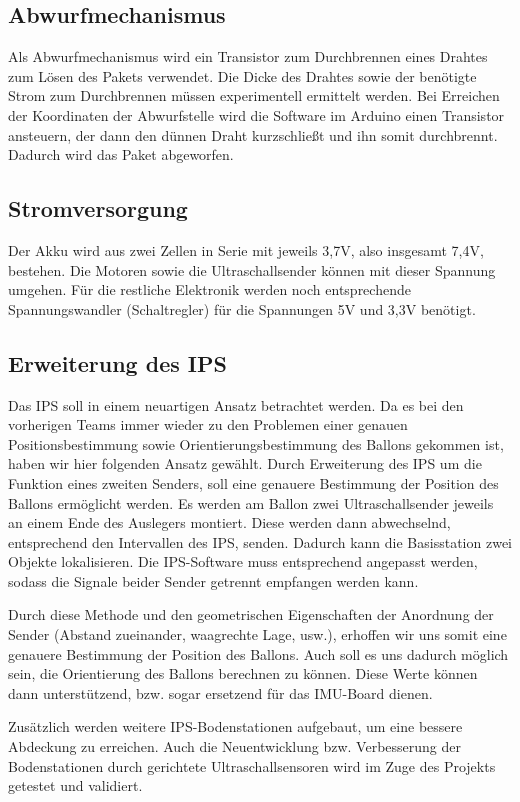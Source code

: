 \documentclass[lang=ngerman,inputenc=utf8,fontsize=10pt]{ldvarticle}
\begin{document}
\subsection*{Abwurfmechanismus}
Als Abwurfmechanismus wird ein Transistor zum Durchbrennen eines Drahtes zum Lösen des Pakets verwendet. Die Dicke des Drahtes sowie der benötigte Strom zum Durchbrennen müssen experimentell ermittelt werden. Bei Erreichen der Koordinaten der Abwurfstelle wird die Software im Arduino einen Transistor ansteuern, der dann den dünnen Draht kurzschließt und ihn somit durchbrennt. Dadurch wird das Paket abgeworfen.
\subsection*{Stromversorgung}
Der Akku wird aus zwei Zellen in Serie mit jeweils 3,7V, also insgesamt 7,4V, bestehen. Die Motoren sowie die Ultraschallsender können mit dieser Spannung umgehen. Für die restliche Elektronik werden noch entsprechende Spannungswandler (Schaltregler) für die Spannungen 5V und 3,3V benötigt.
\subsection*{Erweiterung des IPS}
Das IPS soll in einem neuartigen Ansatz betrachtet werden. Da es bei den vorherigen Teams immer wieder zu den Problemen einer genauen Positionsbestimmung sowie Orientierungsbestimmung des Ballons gekommen ist, haben wir hier folgenden Ansatz gewählt.
Durch Erweiterung des IPS um die Funktion eines zweiten Senders, soll eine genauere Bestimmung der Position des Ballons ermöglicht werden. Es werden am Ballon zwei Ultraschallsender jeweils an einem Ende des Auslegers montiert. Diese werden dann abwechselnd, entsprechend den Intervallen des IPS, senden. Dadurch kann die Basisstation zwei Objekte lokalisieren. Die IPS-Software muss entsprechend angepasst werden, sodass die Signale beider Sender getrennt empfangen werden kann.

Durch diese Methode und den geometrischen Eigenschaften der Anordnung der Sender (Abstand zueinander, waagrechte Lage, usw.), erhoffen wir uns somit eine genauere Bestimmung der Position des Ballons. Auch soll es uns dadurch möglich sein, die Orientierung des Ballons berechnen zu können. Diese Werte können dann unterstützend, bzw. sogar ersetzend für das IMU-Board dienen.


Zusätzlich werden weitere IPS-Bodenstationen aufgebaut, um eine bessere Abdeckung zu erreichen. Auch die Neuentwicklung bzw. Verbesserung der Bodenstationen durch gerichtete Ultraschallsensoren wird im Zuge des Projekts getestet und validiert.
\end{document}
